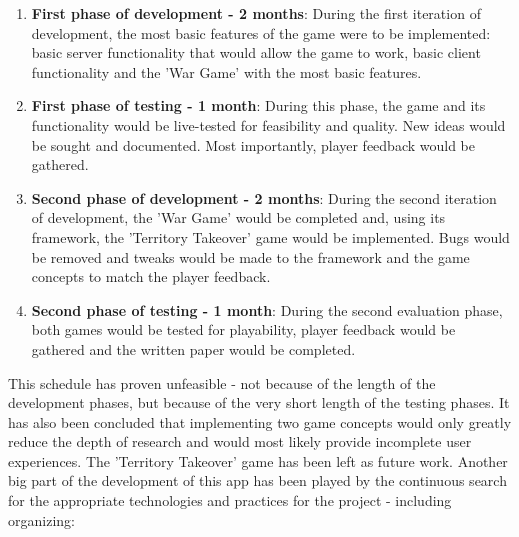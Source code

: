 \begin{enumerate}
  \item \textbf{First phase of development - 2 months}: During the first
  iteration of development, the most basic features of the game were to be
  implemented: basic server functionality that would allow the game to work,
  basic client functionality and the 'War Game' with the most basic features.
   
  \item \textbf{First phase of testing - 1 month}: During this phase, the game
  and its functionality would be live-tested for feasibility and quality. New
  ideas would be sought and documented. Most importantly, player feedback would
  be gathered. 
  
  \item \textbf{Second phase of development - 2 months}: During the second
  iteration of development, the 'War Game' would be completed and, using its
  framework, the 'Territory Takeover' game would be implemented. Bugs would be
  removed and tweaks would be made to the framework and the game concepts to
  match the player feedback.
  
  \item \textbf{Second phase of testing - 1 month}: During the second evaluation
  phase, both games would be tested for playability, player feedback would be
  gathered and the written paper would be completed.
\end{enumerate}

This schedule has proven unfeasible - not because of the length of the
development phases, but because of the very short length of the testing phases.
It has also been concluded that implementing two game concepts would only
greatly reduce the depth of research and would most likely provide incomplete
user experiences. The 'Territory Takeover' game has been left as future
work. Another big part of the development of this app has been played by the
continuous search for the appropriate technologies and practices for the project
- including organizing:

